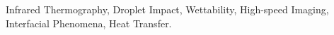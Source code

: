 \begin{keywords}
Infrared Thermography, Droplet Impact, Wettability, High-speed Imaging, Interfacial Phenomena, Heat Transfer.
\end{keywords}
\clearpage
\thispagestyle{empty}
\cleardoublepage